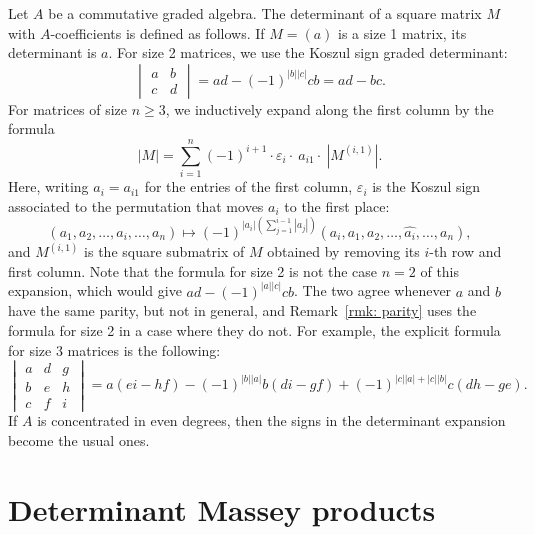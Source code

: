 \documentclass[11pt]{article}
\theoremstyle{definition}
\theoremstyle{definition}
\begin{document}
Let $A$ be a commutative graded algebra. 
The determinant of a square matrix $M$ with $A$-coefficients is defined as follows.
If $M=(a)$ is a size 1 matrix, its determinant is $a$.
For size 2 matrices, 
we use the Koszul sign graded determinant: 
\begin{equation*}
\begin{vmatrix}
a & b \\
c & d 
\end{vmatrix} = ad - (-1)^{|b||c|} cb = ad - bc.
\end{equation*}
For matrices of size $n\geq 3$, we inductively expand along the first column by the formula
\begin{equation*}
|M|= \sum_{i=1}^{n} (-1)^{i +1}\cdot \varepsilon_i\cdot \ a_{i1} \cdot \ |M^{(i,1)}|.
\end{equation*}
Here, writing $a_i=a_{i1}$ for the entries of the first column,
$\varepsilon_i$ is the Koszul sign associated to the permutation that moves $a_i$ to 
the first place:
\begin{equation*}
\left(a_1,a_2,\ldots,a_i,\ldots,a_n\right) 
\mapsto (-1)^{|a_i|\left(\sum_{j=1}^{i-1}|a_j|\right)}\left(a_i,a_1,a_2,\ldots,\widehat{a_i},\ldots,a_n\right), 
\end{equation*}
and $M^{(i,1)}$ is the square submatrix of $M$ obtained by removing its $i$-th row and first column.
Note that the formula for size 2 is not the case $n=2$ of this expansion, 
which would give $ad-(-1)^{|a||c|}cb$. The two agree whenever $a$ and $b$ have the same parity,
but not in general, and Remark~\ref{rmk: parity} uses the formula for size 2 in a case where they do not.
For example, the explicit formula for size 3 matrices is the following: 
\begin{equation*}
\begin{vmatrix}
a & d & g \\
b & e & h \\
c & f & i 
\end{vmatrix} =  a \left( e i - hf \right) - (-1)^{|b||a|} b \left( d i - gf \right)
+ (-1)^{|c||a| + |c||b|} c \left( d h - ge \right).
\end{equation*}
If $A$ is concentrated in even degrees, then the signs in the determinant expansion become the usual ones.


 









\section{Determinant Massey products}
\label{sec: determinant Massey products}
\end{document}
